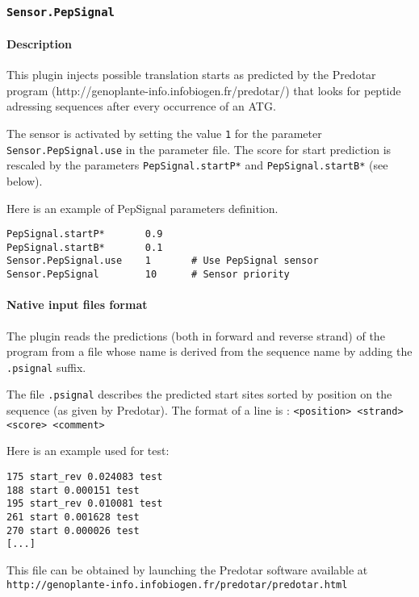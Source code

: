 
\subsubsection{\texttt{Sensor.PepSignal}}


\paragraph{Description}
This plugin injects possible translation starts as predicted by the Predotar
 program (http://genoplante-info.infobiogen.fr/predotar/) that looks for 
peptide adressing sequences after every occurrence of an ATG. 

The sensor is activated by setting the value \texttt{1} for the parameter
\texttt{Sensor.PepSignal.use} in the parameter file. The score for start
 prediction is rescaled by the parameters {\tt PepSignal.startP*} and
{\tt PepSignal.startB*} (see below).

Here is an example of PepSignal parameters definition.
\begin{Verbatim}[fontsize=\small]
PepSignal.startP*       0.9
PepSignal.startB*       0.1
Sensor.PepSignal.use    1       # Use PepSignal sensor	
Sensor.PepSignal        10      # Sensor priority
\end{Verbatim}


\paragraph{Native input files format}
The plugin reads 
the predictions (both in forward and reverse strand) of the program 
from a file whose name is derived 
from the sequence name by adding the \texttt{.psignal} suffix.

The file \texttt{.psignal} describes the predicted start sites
sorted by position on the sequence (as given by Predotar).
The format of a line is : \texttt{<position> <strand> <score> <comment>}

Here is an example used for test:
\begin{Verbatim}[fontsize=\small]
175 start_rev 0.024083 test
188 start 0.000151 test
195 start_rev 0.010081 test
261 start 0.001628 test
270 start 0.000026 test
[...]
\end{Verbatim}

This file can be obtained by launching the Predotar software
available at\\
\texttt{http://genoplante-info.infobiogen.fr/predotar/predotar.html}


